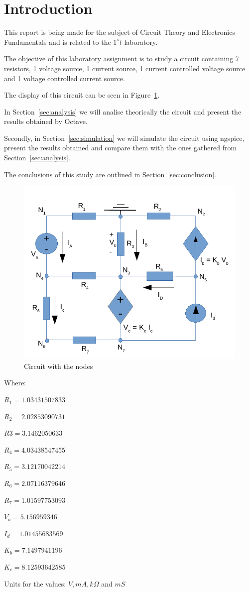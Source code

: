 \section{Introduction}
\label{sec:introduction}


This report is being made for the subject of Circuit Theory and Electronics Fundamentals and is related to the $1^st$ laboratory.

The objective of this laboratory assignment is to study a circuit containing 7 resistors, 1 voltage source, 1 current source, 1 current controlled voltage source and 1 voltage controlled current source.

The display of this circuit can be seen in Figure~\ref{fig:circuito}.

In Section~\ref{sec:analysis} we will analise theorically the circuit and present the results obtained by Octave.

Secondly, in Section~\ref{sec:simulation} we will simulate the circuit using ngspice, present the results obtained and compare them with the ones gathered from Section~\ref{sec:analysis}.

The conclusions of this study are outlined in Section~\ref{sec:conclusion}.

\begin{figure}[h] \centering
\includegraphics[width=0.7\linewidth]{circuito.pdf}
\caption{Circuit with the nodes} %
\label{fig:circuito}
\end{figure}


\begin{center}
Where:

$R_1 = 1.03431507833 $

$R_2 = 2.02853090731$
 
$R3 = 3.1462050633 $

$R_4 = 4.03438547455$ 

$R_5 = 3.12170042214 $

$R_6 = 2.07116379646 $

$R_7 = 1.01597753093 $

$V_a = 5.156959346 $

$I_d = 1.01455683569 $

$K_b = 7.1497941196 $

$K_c = 8.12593642585 $
\end{center}

Units for the values: $V, mA, k\Omega$ and $mS$



